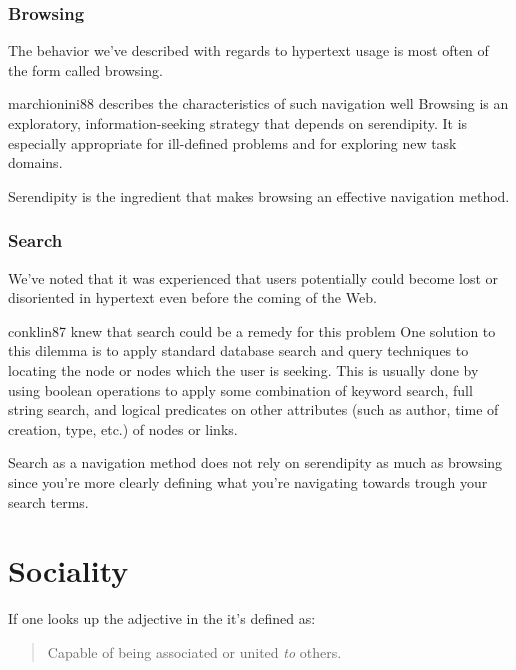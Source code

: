 \subsubsection{Browsing}
The behavior we've described with regards to hypertext usage is most often
of the form called browsing.
\begin{fullquote}[\p{71}]{marchionini88}{%
  describes the characteristics of such navigation well}
    Browsing is an exploratory, information-seeking
    strategy that depends on serendipity. It is
    especially appropriate for ill-defined problems
    and for exploring new task domains.
\end{fullquote}

Serendipity%
is the ingredient that makes browsing an effective navigation method.

\subsubsection{Search}
\label{section:background.navigation.navigation.on.the.web.search}
We've noted that it was experienced that users potentially could become lost
or disoriented in hypertext even before the coming of the Web.
\begin{fullquote}[\p{38}]{conklin87}{%
  knew that search could be a remedy for this problem}
    One solution to this dilemma is to apply standard data\-base search and
    query techniques to locating the node or nodes which the user is seeking.
    This is usually done by using boolean operations to apply some combination
    of keyword search, full string search, and logical predicates on other
    attributes (such as author, time of creation, type, etc.)
    of nodes or links.
\end{fullquote}

Search as a navigation method does not rely on serendipity as much as browsing
since you're more clearly defining what you're navigating towards trough your
search terms.

\section{Sociality}

If one looks up the adjective  in the
 \citep[]{simpson89}
it's defined as:

\begin{quote}
  Capable of being associated or united \emph{to} others.
\end{quote}

